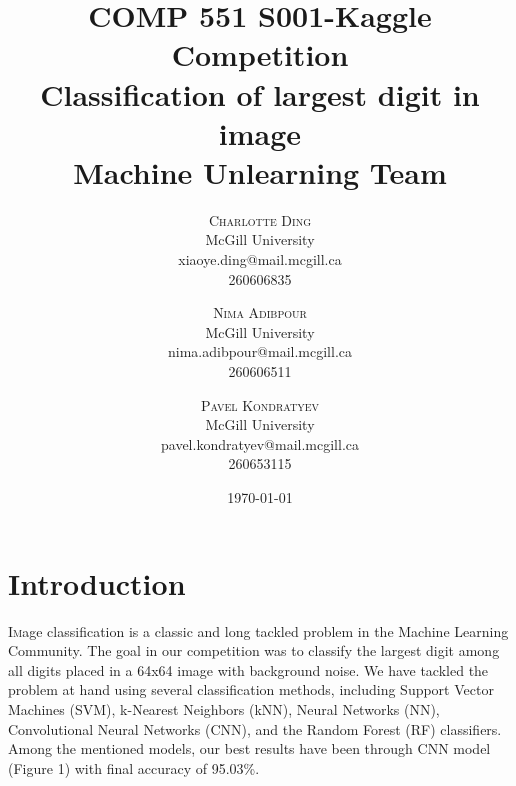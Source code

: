 \documentclass[twoside,twocolumn]{article}
\title{%
	\huge COMP 551 S001-Kaggle Competition \\
	\large Classification of largest digit in image \\
	\large Machine Unlearning Team}
\author{%
\textsc{Charlotte Ding} \\
\normalsize McGill University \\ 
\normalsize xiaoye.ding@mail.mcgill.ca \\
\normalsize {260606835} 
\and 
\textsc{Nima Adibpour} \\
\normalsize McGill University \\ 
\normalsize nima.adibpour@mail.mcgill.ca \\
\normalsize {260606511} 
\and 
\textsc{Pavel Kondratyev} \\
\normalsize McGill University \\ 
\normalsize pavel.kondratyev@mail.mcgill.ca \\
\normalsize {260653115} 
}
\date{\today} %
\begin{document}
\maketitle


\section{Introduction}

\lettrine[nindent=0em,lines=2]{I} mage classification is a classic and long tackled problem in the Machine Learning Community. The goal in our competition was to classify the largest digit among all digits placed in a 64x64 image with background noise. We have tackled the problem at hand using several classification methods, including Support Vector Machines (SVM), k-Nearest Neighbors (kNN), Neural Networks (NN), Convolutional Neural Networks (CNN), and the Random Forest (RF) classifiers. Among the mentioned models, our best results have been through CNN model (Figure 1) with final accuracy of 95.03\%.


\end{document}
